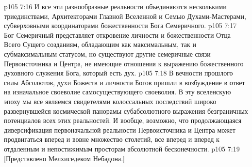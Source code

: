 \vs p105 7:16 И все эти разнообразные реальности объединяются  несколькими триединствами,  Архитекторами Главной Вселенной и  Семью Духами\hyp{}Мастерами, субверховными координаторами божественности Бога Семеричного.
\vs p105 7:17 Бог Семеричный представляет откровение личности и божественности Отца Всего Сущего созданиям, обладающим как максимальным, так и субмаксимальным статусом, но существуют другие семеричные связи Первоисточника и Центра, не имеющие отношения к выражению божественного духовного служения Бога, который есть дух.
\vs p105 7:18 \pc В вечности прошлого силы Абсолютов, духи Божеств и личности Богов пришли в возбуждение в ответ на изначальное своеволие самосуществующего своеволия. В эту вселенскую эпоху мы все являемся свидетелями колоссальных последствий широко развернувшейся космической панорамы субабсолютного выражения безграничных потенциалов всех этих реальностей. И вообще, возможно, что продолжающаяся диверсификация первоначальной реальности Первоисточника и Центра может продвигаться вперед и вовне множество столетий, все вперед и вперед к отдаленным и непостижимым просторам абсолютной бесконечности.
\vsetoff
\vs p105 7:19 [Представлено Мелхиседеком Небадона.]

